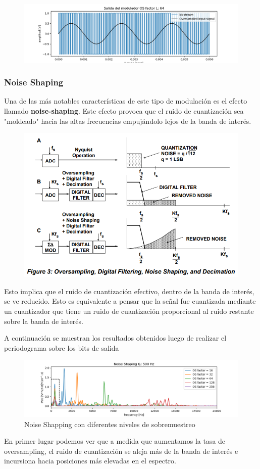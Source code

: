 \begin{figure}[H]
	\centering
	\includegraphics[width=0.7\linewidth]{ImagenesEjercicio2/BitsStream64}
	\caption{}
	\label{fig:bitsstream64}
\end{figure}


\subsubsection{Noise Shaping}
Una de las más notables características de este tipo de modulación es el efecto llamado \textbf{noise-shaping}. Este efecto provoca que el ruido de cuantización sea "moldeado" hacia las altas frecuencias empujándolo lejos de la banda de interés.


\begin{figure}[H]
	\centering
	\includegraphics[width=0.7\linewidth]{ImagenesEjercicio2/NoiseShappingAN}
	\caption{}
	\label{fig:noiseshappingan}
\end{figure}


Esto implica que el ruido de cuantización efectivo, dentro de la banda de interés, se ve reducido. Esto es equivalente a pensar que la señal fue cuantizada mediante un cuantizador que tiene un ruido de cuantización proporcional al ruido restante sobre la banda de interés.

A continuación se muestran los resultados obtenidos luego de realizar el periodograma sobre los bits de salida

\begin{figure}[H]
	\centering
	\includegraphics[width=\linewidth]{ImagenesEjercicio2/NoiseShappingDemo1zoom2solid.png}
	\caption{Noise Shapping con diferentes niveles de sobremuestreo}
	\label{fig:noiseshappingdemo1}
\end{figure}
En primer lugar podemos ver que a medida que aumentamos la tasa de oversampling, el ruido de cuantización se aleja más de la banda de interés e incursiona hacia posiciones más elevadas en el espectro.

